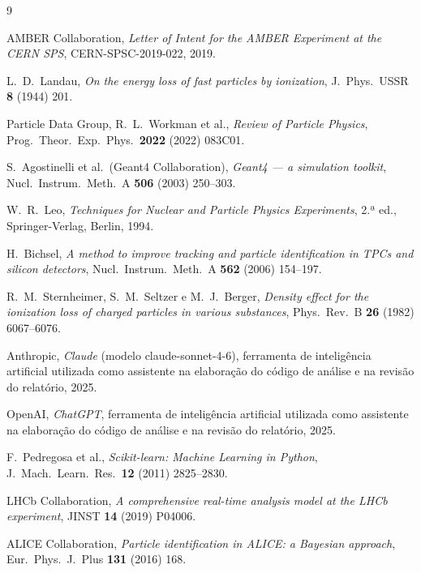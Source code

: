 \documentclass[12pt,a4paper]{article}
\begin{document}
\begin{thebibliography}{9}

  AMBER Collaboration,
  \textit{Letter of Intent for the AMBER Experiment at the CERN SPS},
  CERN-SPSC-2019-022, 2019.

  L.~D.~Landau,
  \textit{On the energy loss of fast particles by ionization},
  J.\ Phys.\ USSR \textbf{8} (1944) 201.

  Particle Data Group,
  R.~L.~Workman et al.,
  \textit{Review of Particle Physics},
  Prog.\ Theor.\ Exp.\ Phys.\ \textbf{2022} (2022) 083C01.

  S.~Agostinelli et al.\ (Geant4 Collaboration),
  \textit{Geant4 — a simulation toolkit},
  Nucl.\ Instrum.\ Meth.\ A \textbf{506} (2003) 250--303.

  W.~R.~Leo,
  \textit{Techniques for Nuclear and Particle Physics Experiments},
  2.ª ed., Springer-Verlag, Berlin, 1994.

  H.~Bichsel,
  \textit{A method to improve tracking and particle identification in TPCs
  and silicon detectors},
  Nucl.\ Instrum.\ Meth.\ A \textbf{562} (2006) 154--197.

  R.~M.~Sternheimer, S.~M.~Seltzer e M.~J.~Berger,
  \textit{Density effect for the ionization loss of charged particles in
  various substances},
  Phys.\ Rev.\ B \textbf{26} (1982) 6067--6076.

  Anthropic,
  \textit{Claude} (modelo claude-sonnet-4-6),
  ferramenta de inteligência artificial utilizada como assistente na
  elaboração do código de análise e na revisão do relatório, 2025.

  OpenAI,
  \textit{ChatGPT},
  ferramenta de inteligência artificial utilizada como assistente na
  elaboração do código de análise e na revisão do relatório, 2025.

  F.~Pedregosa et al.,
  \textit{Scikit-learn: Machine Learning in Python},
  J.\ Mach.\ Learn.\ Res.\ \textbf{12} (2011) 2825--2830.

  LHCb Collaboration,
  \textit{A comprehensive real-time analysis model at the LHCb experiment},
  JINST \textbf{14} (2019) P04006.

  ALICE Collaboration,
  \textit{Particle identification in ALICE: a Bayesian approach},
  Eur.\ Phys.\ J.\ Plus \textbf{131} (2016) 168.

\end{thebibliography}
\end{document}
